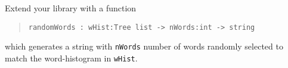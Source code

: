 \label{randomWords}
Extend your library with a function
\begin{quote}
  \mbox{\lstinline!randomWords : wHist:Tree list -> nWords:int -> string!}
\end{quote}
which generates a string with \lstinline!nWords! number of words
randomly selected to match the word-histogram in
\lstinline!wHist!.
